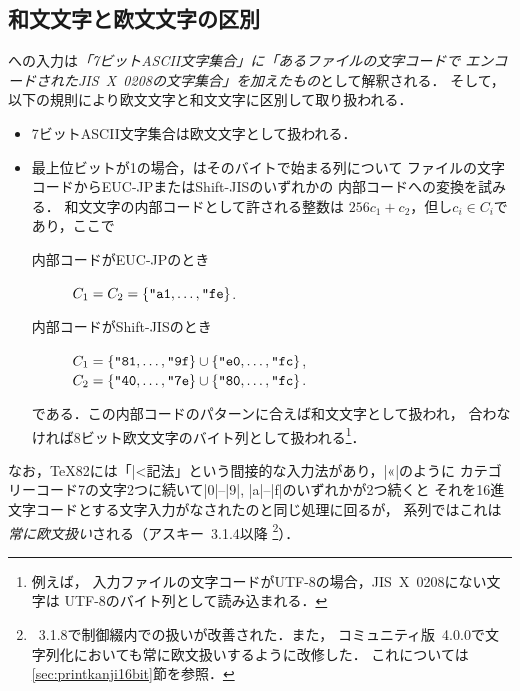 \documentclass[a4paper,11pt,nomag,dvipdfmx]{jsarticle}
\begin{document}
\subsection{和文文字と欧文文字の区別}
\pTeX への入力は\emph{「7ビットASCII文字集合」に「あるファイルの文字コードで
エンコードされたJIS~X~0208の文字集合」を加えたもの}として解釈される．
そして，以下の規則により欧文文字と和文文字に区別して取り扱われる．
\begin{itemize}
 \item 7ビットASCII文字集合は欧文文字として扱われる．
 \item 最上位ビットが1の場合，\pTeX はそのバイトで始まる列について
    ファイルの文字コードからEUC-JPまたはShift-JISのいずれかの
    内部コードへの変換を試みる．
    和文文字の内部コードとして許される整数は
    $256c_1+c_2$，但し$c_i\in C_i$であり，ここで
  \begin{description}
   \item[内部コードがEUC-JPのとき]
    $C_1=C_2=\{\hex{a1},\dots,\hex{fe}\}$.
   \item[内部コードがShift-JISのとき]
    $C_1=\{\hex{81},\dots,\hex{9f}\}\cup\{\hex{e0},\dots,\hex{fc}\}$,\\
    $C_2=\{\hex{40},\dots,\hex{7e}\}\cup\{\hex{80},\dots,\hex{fc}\}$.
  \end{description}
    である．この内部コードのパターンに合えば和文文字として扱われ，
    合わなければ8ビット欧文文字のバイト列として扱われる\footnote{例えば，
    入力ファイルの文字コードがUTF-8の場合，JIS~X~0208にない文字は
    UTF-8のバイト列として読み込まれる．}．
\end{itemize}

なお，\TeX82には「|^^|記法」という間接的な入力法があり，|^^ab|のように
カテゴリーコード7の文字2つに続いて|0|--|9|, |a|--|f|のいずれかが2つ続くと
それを16進文字コードとする文字入力がなされたのと同じ処理に回るが，
\pTeX 系列ではこれは\emph{常に欧文扱い}される（アスキー\pTeX~3.1.4以降
\footnote{\pTeX~3.1.8で制御綴内での扱いが改善された．また，
コミュニティ版\pTeX~4.0.0で文字列化においても常に欧文扱いするように改修した．
これについては\ref{sec:printkanji16bit}節を参照．}）．
\end{document}
